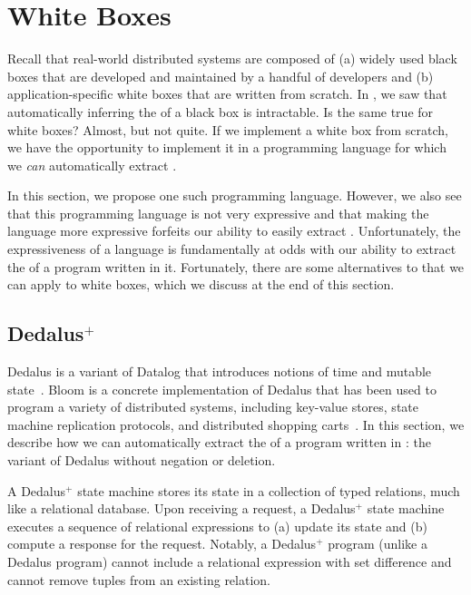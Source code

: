 \newcommand{\dedalusplus}{Dedalus$^+$}

\section{White Boxes}
Recall that real-world distributed systems are composed of (a) widely used
black boxes that are developed and maintained by a handful of developers and
(b) application-specific white boxes that are written from scratch. In
, we saw that automatically inferring the \watprovenance{}
of a black box is intractable. Is the same true for white boxes? Almost, but
not quite. If we implement a white box from scratch, we have the opportunity to
implement it in a programming language for which we \emph{can} automatically
extract \watprovenance{}.

In this section, we propose one such programming language. However, we also see
that this programming language is not very expressive and that making the
language more expressive forfeits our ability to easily extract
\watprovenance{}. Unfortunately, the expressiveness of a language is
fundamentally at odds with our ability to extract the \watprovenance{} of a
program written in it. Fortunately, there are some alternatives to
\watprovenance{} that we can apply to white boxes, which we discuss at the end
of this section.

\subsection{\dedalusplus}
{}

Dedalus is a variant of Datalog that introduces notions of time and mutable
state~\cite{alvaro2011dedalus, marczak2012confluence, alvaro2013declarative}.
Bloom is a concrete implementation of Dedalus that has been used to program a
variety of distributed systems, including key-value stores, state machine
replication protocols, and distributed shopping
carts~\cite{alvaro2011consistency, conway2012logic}. In this section, we
describe how we can automatically extract the \watprovenance{} of a program
written in \defword{\dedalusplus}: the variant of Dedalus without negation or
deletion.

A \dedalusplus{} state machine stores its state in a collection of typed
relations, much like a relational database. Upon receiving a request, a
\dedalusplus{} state machine executes a sequence of relational expressions to
(a) update its state and (b) compute a response for the request. Notably, a
\dedalusplus{} program (unlike a Dedalus program) cannot include a relational
expression with set difference and cannot remove tuples from an existing
relation.

